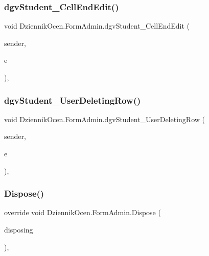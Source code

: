 \subsubsection{\texorpdfstring{dgv\+Student\+\_\+\+Cell\+End\+Edit()}{dgvStudent\_CellEndEdit()}}
{\footnotesize\ttfamily void Dziennik\+Ocen.\+Form\+Admin.\+dgv\+Student\+\_\+\+Cell\+End\+Edit (\begin{DoxyParamCaption}\item[{object}]{sender,  }\item[{Data\+Grid\+View\+Cell\+Event\+Args}]{e }\end{DoxyParamCaption})\hspace{0.3cm}{\ttfamily [inline]}, {\ttfamily [private]}}

\mbox{\label{class_dziennik_ocen_1_1_form_admin_af3ef7cac8cbb4acf92efdd1c3d278647}} 
\subsubsection{\texorpdfstring{dgv\+Student\+\_\+\+User\+Deleting\+Row()}{dgvStudent\_UserDeletingRow()}}
{\footnotesize\ttfamily void Dziennik\+Ocen.\+Form\+Admin.\+dgv\+Student\+\_\+\+User\+Deleting\+Row (\begin{DoxyParamCaption}\item[{object}]{sender,  }\item[{Data\+Grid\+View\+Row\+Cancel\+Event\+Args}]{e }\end{DoxyParamCaption})\hspace{0.3cm}{\ttfamily [inline]}, {\ttfamily [private]}}

\mbox{\label{class_dziennik_ocen_1_1_form_admin_a226138ac8da3cb8b2064e61823c13a3a}} 
\subsubsection{\texorpdfstring{Dispose()}{Dispose()}}
{\footnotesize\ttfamily override void Dziennik\+Ocen.\+Form\+Admin.\+Dispose (\begin{DoxyParamCaption}\item[{bool}]{disposing }\end{DoxyParamCaption})\hspace{0.3cm}{\ttfamily [inline]}, {\ttfamily [protected]}}




